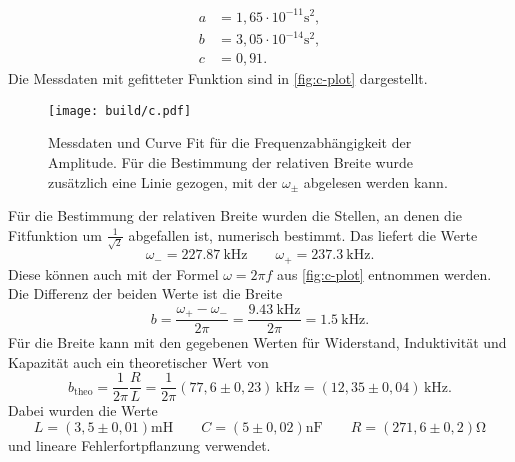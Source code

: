 \begin{align}
	a &= 1,65 \cdot 10^{-11} \si{\second^2}, \\
	b &= 3,05 \cdot 10^{-14} \si{\second^2}, \\
	c &= 0,91.
\end{align}
Die Messdaten mit gefitteter Funktion sind in \autoref{fig:c-plot} dargestellt.
\begin{figure}
	\centering
	\texttt{[image: build/c.pdf]}
	\caption{Messdaten und Curve Fit für die Frequenzabhängigkeit der Amplitude. Für
	die Bestimmung der relativen Breite wurde zusätzlich eine Linie gezogen, mit der
	$\omega_{\pm}$ abgelesen werden kann.}
	\label{fig:c-plot}
\end{figure}
Für die Bestimmung der relativen Breite wurden die Stellen, an denen die Fitfunktion um
$\frac{1}{\sqrt 2}$ abgefallen ist, numerisch bestimmt. Das liefert die Werte
\begin{equation}
	\omega_- = \SI{227.87}{\kilo\hertz}
	\qquad
	\omega_+ = \SI{237.3}{\kilo\hertz}.
\end{equation}
Diese können auch mit der Formel $\omega = 2\pi f$ aus \autoref{fig:c-plot} entnommen
werden. Die Differenz der beiden Werte ist die Breite
\begin{equation}
	b = \frac{\omega_+ - \omega_-}{2\pi} = \frac{\SI{9.43}{\kilo\hertz}}{2\pi}
	= \SI{1.5}{\kilo\hertz}.
\end{equation}
Für die Breite kann mit den gegebenen Werten für Widerstand, Induktivität und Kapazität
auch ein theoretischer Wert von 
\begin{equation}
	b_\text{theo} = \frac{1}{2\pi} \frac{R}{L} 
	= \frac{1}{2\pi}(77,6 \pm 0,23)	\,\si{\kilo\hertz}
	= (12,35 \pm 0,04) \,\si{\kilo\hertz}.
\end{equation}
Dabei wurden die Werte
\begin{equation}
	L = (3,5 \pm 0,01) \si{\milli\henry} \qquad
	C = (5 \pm 0,02) \si{\nano\farad} \qquad
	R = (271,6 \pm 0,2) \si{\ohm}
\end{equation}
und lineare Fehlerfortpflanzung verwendet.
